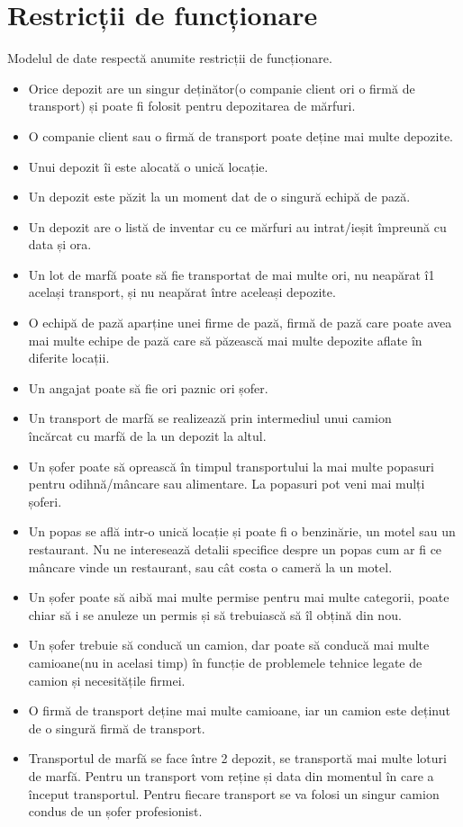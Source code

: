 \documentclass[12pt, a4paper]{article}
\begin{document}
\section{Restricții de funcționare}
\quad \par
Modelul de date respectă anumite restricții de funcționare.
\begin{itemize}
    \item Orice depozit are un singur deținător(o companie client ori o firmă de transport) și poate fi folosit pentru depozitarea de mărfuri.
    \item O companie client sau o firmă de transport poate deține mai multe depozite.
    \item Unui depozit îi este alocată o unică locație.
    \item Un depozit este păzit la un moment dat de o singură echipă de pază.
    \item Un depozit are o listă de inventar cu ce mărfuri au intrat/ieșit împreună cu data și ora.
    \item Un lot de marfă poate să fie transportat de mai multe ori, nu neapărat î1 același transport, și nu neapărat între aceleași depozite.
    \item O echipă de pază aparține unei firme de pază, firmă de pază care poate avea mai multe echipe de pază care să păzească mai multe depozite aflate în diferite locații.
    \item Un angajat poate să fie ori paznic ori șofer.
    \item Un transport de marfă se realizează prin intermediul unui camion \\încărcat cu marfă de la un depozit la altul.
    \item Un șofer poate să oprească în timpul transportului la mai multe popasuri pentru odihnă/mâncare sau alimentare. La popasuri pot veni mai mulți șoferi.
    \item Un popas se află intr-o unică locație și poate fi o benzinărie, un motel sau un restaurant. Nu ne interesează detalii specifice despre un popas cum ar fi ce mâncare vinde un restaurant, sau cât costa o cameră la un motel.
    \item Un șofer poate să aibă mai multe permise pentru mai multe categorii, poate chiar să i se anuleze un permis și să trebuiască să îl obțină din nou.
    \item Un șofer trebuie să conducă un camion, dar poate să conducă mai multe camioane(nu in acelasi timp) în funcție de problemele tehnice legate de camion și necesitățile firmei.
    \item O firmă de transport deține mai multe camioane, iar un camion este deținut de o singură firmă de transport.
    \item Transportul de marfă se face între 2 depozit, se transportă mai multe loturi de marfă. Pentru un transport vom reține și data din momentul în care a început transportul. Pentru fiecare transport se va folosi un singur camion condus de un șofer profesionist.
\end{itemize}
\end{document}
